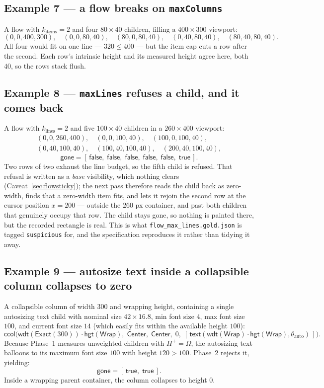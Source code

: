 \documentclass[11pt,a4paper]{article}
\newcommand{\Om}{\Omega}
\newcommand{\Exact}{\mathsf{Exact}}
\newcommand{\Wrap}{\mathsf{Wrap}}
\newcommand{\wdt}{\mathsf{wdt}}
\newcommand{\hgt}{\mathsf{hgt}}
\newcommand{\ttext}{\mathsf{text}}
\newcommand{\ccolp}{\mathsf{ccol}}
\newcommand{\gone}{\mathsf{gone}}
\newcommand{\Center}{\mathsf{Center}}
\newcommand{\jv}[1]{\texttt{#1}}       %
\newcommand{\file}[1]{\texttt{#1}}
\theoremstyle{definition}
\theoremstyle{plain}
\theoremstyle{remark}
\begin{document}
\subsection*{Example 7 --- a flow breaks on \texttt{maxColumns}}

A flow with $k_{\mathrm{items}} = 2$ and four $80 \times 40$ children, filling a
$400 \times 300$ viewport:
\[
  (0,0,400,300),\quad (0,0,80,40),\quad (80,0,80,40),\quad
  (0,40,80,40),\quad (80,40,80,40).
\]
All four would fit on one line --- $320 \leq 400$ --- but the item cap cuts a row
after the second. Each row's intrinsic height and its measured height agree here,
both $40$, so the rows stack flush.

\subsection*{Example 8 --- \texttt{maxLines} refuses a child, and it comes back}

A flow with $k_{\mathrm{lines}} = 2$ and five $100 \times 40$ children in a
$260 \times 400$ viewport:
\[
  \begin{gathered}
    (0,0,260,400),\quad (0,0,100,40),\quad (100,0,100,40), \\
    (0,40,100,40),\quad (100,40,100,40),\quad (200,40,100,40),
  \end{gathered}
\]
\[
  \gone = [\,\textsf{false},\;\textsf{false},\;\textsf{false},\;
             \textsf{false},\;\textsf{false},\;\textsf{true}\,].
\]
Two rows of two exhaust the line budget, so the fifth child is refused. That
refusal is written as a \emph{base} visibility, which nothing clears
(Caveat~\ref{sec:flowsticky}); the next pass therefore reads the child back as
zero-width, finds that a zero-width item fits, and lets it rejoin the second row
at the cursor position $x = 200$ --- outside the $260$ px container, and past
both children that genuinely occupy that row. The child stays gone, so nothing
is painted there, but the recorded rectangle is real. This is what
\file{flow\_max\_lines.gold.json} is tagged \jv{suspicious} for, and the
specification reproduces it rather than tidying it away.

\subsection*{Example 9 --- autosize text inside a collapsible column collapses to zero}

A collapsible column of width $300$ and wrapping height, containing a single autosizing
text child with nominal size $42 \times 16.8$, min font size $4$, max font size $100$,
and current font size $14$ (which easily fits within the available height $100$):
\[
  \ccolp\bigl(\wdt(\Exact(300))\cdot\hgt(\Wrap),\; \Center,\; \Center,\; 0,\;
    [\,\ttext(\wdt(\Wrap)\cdot\hgt(\Wrap), \theta_{\mathrm{auto}})\,]\bigr).
\]
Because Phase~1 measures unweighted children with $H^+ = \Om$, the autosizing text balloons
to its maximum font size $100$ with height $120 > 100$. Phase~2 rejects it, yielding:
\[
  \gone = [\,\textsf{true},\; \textsf{true}\,].
\]
Inside a wrapping parent container, the column collapses to height $0$.
\end{document}
